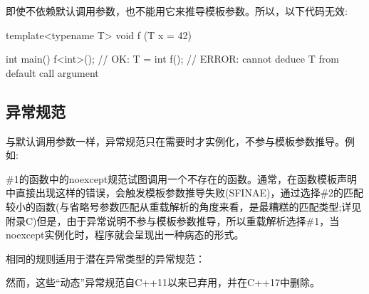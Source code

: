 即使不依赖默认调用参数，也不能用它来推导模板参数。所以，以下代码无效:

\begin{cpp}
template<typename T>
void f (T x = 42)
{ }

int main()
{
	f<int>(); // OK: T = int
	f(); // ERROR: cannot deduce T from default call argument
}
\end{cpp}

\subsection{异常规范}

与默认调用参数一样，异常规范只在需要时才实例化，不参与模板参数推导。例如:


\#1的函数中的noexcept规范试图调用一个不存在的函数。通常，在函数模板声明中直接出现这样的错误，会触发模板参数推导失败(SFINAE)，通过选择\#2的匹配较小的函数(与省略号参数匹配从重载解析的角度来看，是最糟糕的匹配类型;详见附录C)但是，由于异常说明不参与模板参数推导，所以重载解析选择\#1，当noexcept实例化时，程序就会呈现出一种病态的形式。

相同的规则适用于潜在异常类型的异常规范：


然而，这些“动态”异常规范自C++11以来已弃用，并在C++17中删除。


















